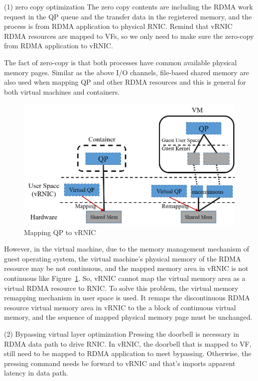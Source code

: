 (1) zero copy optimization
The zero copy contents are including the RDMA work request in the QP queue and the transfer data in the registered memory, and the process is from RDMA application to physical RNIC. Remind that vRNIC RDMA resources are mapped to VFs, so we only need to make sure the zero-copy from RDMA application to vRNIC.

The fact of zero-copy is that both processes have common available physical memory pages. Similar as the above I/O channels, file-based shared memory are also used when mapping QP and other RDMA resources and this is general for both virtual machines and containers.

\begin{figure}[!ht]
	\centering
	\includegraphics[width=1.0\linewidth]{images/zero-copy}
	\caption{Mapping QP to vRNIC}
	\label{fig:zero-copy}
\end{figure}

However, in the virtual machine, due to the memory management mechanism of guest operating system, the virtual machine's physical memory of the RDMA resource may be not continuous, and the mapped memory area in vRNIC is not continuous like Figure~\ref{fig:zero-copy}. So, vRNIC cannot map the virtual memory area as a virtual RDMA resource to RNIC. To solve this problem, the virtual memory remapping mechanism in user space is used. It remaps the discontinuous RDMA resource virtual memory area in vRNIC to the a block of continuous virtual memory, and the sequence of mapped physical memory page must be unchanged.

(2) Bypassing virtual layer optimization
Pressing the doorbell is necessary in RDMA data path to drive RNIC. In vRNIC, the doorbell that is mapped to VF, still need to be mapped to RDMA application to meet bypassing. Otherwise, the pressing command needs be forward to vRNIC and that’s imports apparent latency in data path.

